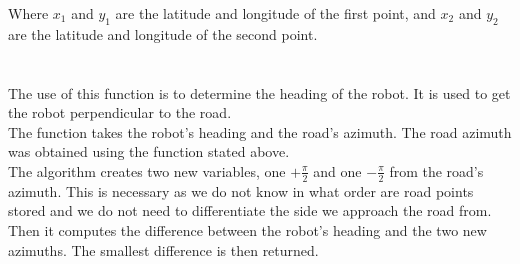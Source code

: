             Where $x_{1}$ and $y_{1}$ are the latitude and longitude of the first point, and $x_{2}$ and $y_{2}$ are the latitude and longitude of the second point.\\\\
        \\
            The use of this function is to determine the heading of the robot. It is used to get the robot perpendicular to the road.\\
            The function takes the robot's heading and the road's azimuth. The road azimuth was obtained using the function stated above.\\
            The algorithm creates two new variables, one $+\frac{\pi}{2}$ and one $-\frac{\pi}{2}$ from the road's azimuth. This is necessary as we do not know in what order are road points stored and we do not need to differentiate the side we approach the road from.\\
            Then it computes the difference between the robot's heading and the two new azimuths. The smallest difference is then returned.
    

